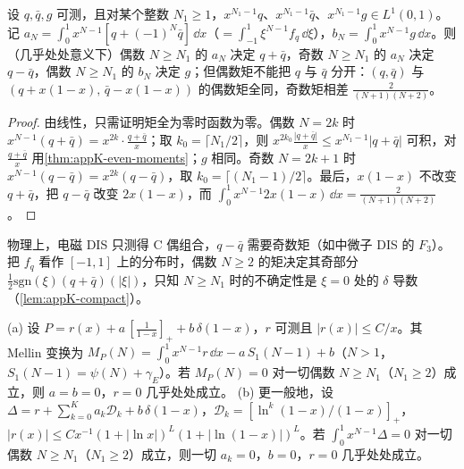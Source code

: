 \begin{corollary}\label{cor:appK-pdf}
设 $q,\bar q,g$ 可测，且对某个整数 $N_1\ge1$，$x^{N_1-1}q$、$x^{N_1-1}\bar q$、$x^{N_1-1}g\in L^1(0,1)$。记 $a_N=\int_0^1x^{N-1}[q+(-1)^N\bar q]\,\dd x$（$=\int_{-1}^1\xi^{N-1}f_q\,\dd\xi$），$b_N=\int_0^1x^{N-1}g\,\dd x$。则（几乎处处意义下）偶数 $N\ge N_1$ 的 $a_N$ 决定 $q+\bar q$，奇数 $N\ge N_1$ 的 $a_N$ 决定 $q-\bar q$，偶数 $N\ge N_1$ 的 $b_N$ 决定 $g$；但偶数矩不能把 $q$ 与 $\bar q$ 分开：$(q,\bar q)$ 与 $(q+x(1-x),\,\bar q-x(1-x))$ 的偶数矩全同，奇数矩相差 $\frac{2}{(N+1)(N+2)}$。
\end{corollary}

\begin{proof}
由线性，只需证明矩全为零时函数为零。偶数 $N=2k$ 时 $x^{N-1}(q+\bar q)=x^{2k}\cdot\frac{q+\bar q}{x}$；取 $k_0=\lceil N_1/2\rceil$，则 $x^{2k_0}\frac{|q+\bar q|}{x}\le x^{N_1-1}|q+\bar q|$ 可积，对 $\frac{q+\bar q}x$ 用\cref{thm:appK-even-moments}；$g$ 相同。奇数 $N=2k+1$ 时 $x^{N-1}(q-\bar q)=x^{2k}(q-\bar q)$，取 $k_0=\lceil(N_1-1)/2\rceil$。最后，$x(1-x)$ 不改变 $q+\bar q$，把 $q-\bar q$ 改变 $2x(1-x)$，而 $\int_0^1x^{N-1}2x(1-x)\,\dd x=\frac{2}{(N+1)(N+2)}$。
\end{proof}

物理上，电磁 DIS 只测得 C 偶组合，$q-\bar q$ 需要奇数矩（如中微子 DIS 的 $F_3$）。把 $f_q$ 看作 $[-1,1]$ 上的分布时，偶数 $N\ge2$ 的矩决定其奇部分 $\frac12\mathrm{sgn}(\xi)(q+\bar q)(|\xi|)$，只知 $N\ge N_1$ 时的不确定性是 $\xi=0$ 处的 $\delta$ 导数（\cref{lem:appK-compact}）。

\begin{proposition}[领头阶核由偶数矩唯一确定]\label{prop:appK-kernels}
(a) 设 $P=r(x)+a\,[\frac1{1-x}]_++b\,\delta(1-x)$，$r$ 可测且 $|r(x)|\le C/x$。其 Mellin 变换为 $M_P(N)=\int_0^1x^{N-1}r\,\dd x-a\,S_1(N-1)+b$（$N>1$，$S_1(N-1)=\psi(N)+\gamma_E$）。若 $M_P(N)=0$ 对一切偶数 $N\ge N_1$（$N_1\ge2$）成立，则 $a=b=0$，$r=0$ 几乎处处成立。
(b) 更一般地，设 $\Delta=r+\sum_{k=0}^Ka_k\mathcal D_k+b\,\delta(1-x)$，$\mathcal D_k=[\ln^k(1-x)/(1-x)]_+$，$|r(x)|\le Cx^{-1}(1+|\ln x|)^L(1+|\ln(1-x)|)^L$。若 $\int_0^1x^{N-1}\Delta=0$ 对一切偶数 $N\ge N_1$（$N_1\ge2$）成立，则一切 $a_k=0$，$b=0$，$r=0$ 几乎处处成立。
\end{proposition}

